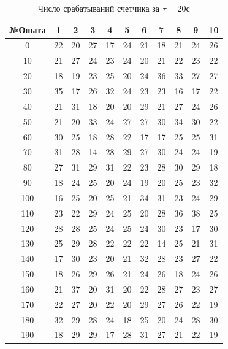 \documentclass[a4paper, 12pt]{article}
\begin{document}
\begin{table}[!h]
\begin{center}
\begin{tabular}{|c|c|c|c|c|c|c|c|c|c|c|}
\hline
№Опыта & 1 & 2 & 3 & 4 & 5 & 6 & 7 & 8 & 9 & 10 \\ \hline
0 & 22 & 20 & 27 & 17 & 24 & 21 & 18 & 21 & 24 & 26 \\ \hline
10 & 21 & 27 & 24 & 23 & 24 & 20 & 21 & 22 & 23 & 22 \\ \hline
20 & 18 & 19 & 23 & 25 & 20 & 24 & 36 & 33 & 27 & 27 \\ \hline
30 & 35 & 17 & 26 & 32 & 24 & 23 & 23 & 16 & 17 & 22 \\ \hline
40 & 21 & 31 & 18 & 20 & 20 & 29 & 21 & 27 & 24 & 26 \\ \hline
50 & 21 & 20 & 33 & 24 & 27 & 27 & 30 & 34 & 30 & 22 \\ \hline
60 & 30 & 25 & 18 & 28 & 22 & 17 & 17 & 25 & 25 & 31 \\ \hline
70 & 31 & 28 & 14 & 28 & 29 & 27 & 30 & 24 & 24 & 19 \\ \hline
80 & 27 & 31 & 29 & 31 & 22 & 23 & 28 & 30 & 29 & 18 \\ \hline
90 & 18 & 24 & 25 & 20 & 24 & 19 & 20 & 25 & 23 & 32 \\ \hline
100 & 16 & 25 & 20 & 25 & 21 & 34 & 31 & 23 & 24 & 29 \\ \hline
110 & 23 & 22 & 29 & 24 & 25 & 20 & 28 & 36 & 38 & 25 \\ \hline
120 & 28 & 28 & 25 & 24 & 25 & 24 & 30 & 23 & 17 & 30 \\ \hline
130 & 25 & 29 & 28 & 22 & 22 & 22 & 14 & 25 & 21 & 31 \\ \hline
140 & 17 & 30 & 23 & 20 & 21 & 32 & 28 & 23 & 27 & 22 \\ \hline
150 & 18 & 26 & 29 & 26 & 21 & 24 & 26 & 18 & 24 & 26 \\ \hline
160 & 21 & 37 & 20 & 31 & 20 & 22 & 28 & 27 & 23 & 27 \\ \hline
170 & 22 & 27 & 20 & 22 & 20 & 29 & 27 & 26 & 22 & 19 \\ \hline
180 & 32 & 29 & 28 & 24 & 18 & 25 & 20 & 24 & 28 & 30 \\ \hline
190 & 18 & 29 & 29 & 17 & 28 & 31 & 27 & 21 & 22 & 19 \\ \hline
\end{tabular}
\caption*{Число срабатываний счетчика за $\tau = 20$с}
\end{center}
\end{table}
\end{document}
